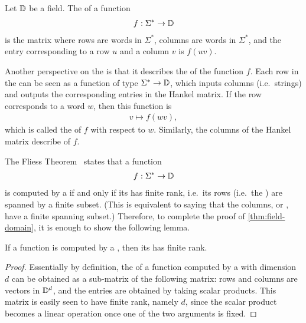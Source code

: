 \begin{definition}\label{def:hankel-matrix}
  \AP
    Let $\mathbb D$ be a field. The  of a function 
    \begin{align*}
    f : \Sigma^* \to \mathbb D
    \end{align*}  
    is the matrix where rows are words in $\Sigma^*$, columns are words in $\Sigma^*$, and the entry corresponding to a row $u$ and a column $v$ is $f(uv)$.
\end{definition}

Another perspective on the  is that it describes the
 of the function $f$. Each row in the  can be
seen as a function of type $\Sigma^* \to \mathbb D$, which inputs columns
(i.e.~strings) and outputs the corresponding entries in the Hankel matrix. If
the row corresponds to a word $w$, then this function is
\begin{align*}
v \mapsto f(wv),
\end{align*}
which is called the  of $f$ with respect to $w$.
Similarly, the columns of the Hankel matrix describe  of $f$.

The Fliess Theorem~\cite[Theorem 2.1.1]{fliess1974} states that a function 
\begin{align*}
f : \Sigma^* \to \mathbb D
\end{align*}
is computed by a  if and only if  its 
has finite rank, i.e.~its rows (i.e.~the ) are spanned by
a finite subset. (This is equivalent to saying that the columns, or , have a finite spanning subset.) Therefore, to complete the proof
of \cref{thm:field-domain}, it is enough to show the following lemma.

\begin{lemma}\label{lem:hankel-finite-rank}
    If a function is computed by a ,
    then its  has finite rank.
\end{lemma}
\begin{proof}
  Essentially by definition, the  of a function computed by a
   with dimension $d$ can be obtained as a
  sub-matrix of the following matrix: rows and columns are vectors in
  $\mathbb D^d$, and the entries are obtained by taking scalar products. This
  matrix is easily seen to have finite rank, namely $d$, since the scalar
  product  becomes a linear operation once one of the two arguments is fixed.
\end{proof}
